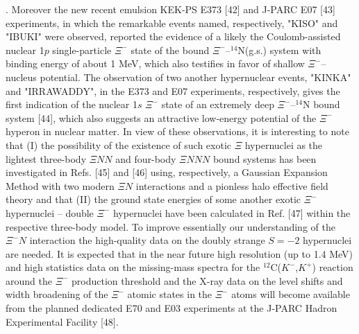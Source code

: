 \documentclass[12pt]{article}
\begin{document}
.
Moreover the new recent emulsion KEK-PS E373 [42] and J-PARC E07 [43] experiments,
in which the remarkable events named, respectively, "KISO" and "IBUKI" were observed, reported the evidence
of a likely the Coulomb-assisted nuclear 1$p$ single-particle $\Xi^-$ state of the bound
$\Xi^-$--$^{14}$N(g.s.) system with binding energy of about 1 MeV, which also testifies in favor of shallow
$\Xi^-$--nucleus potential. The observation of two another hypernuclear events, "KINKA" and "IRRAWADDY",
in the E373 and E07 experiments, respectively, gives the first indication of the nuclear 1$s$ $\Xi^-$ state
of an extremely deep $\Xi^-$--$^{14}$N bound system [44], which also suggests an attractive low-energy potential
of the $\Xi^-$ hyperon in nuclear matter. In view of these observations, it is interesting to note that (I) the
possibility of the existence of such exotic $\Xi$ hypernuclei as the lightest three-body ${\Xi}NN$ and
four-body ${\Xi}NNN$ bound systems has been investigated in Refs. [45] and [46] using, respectively, a
Gaussian Expansion Method with two modern ${\Xi}N$ interactions and a pionless halo effective field theory
and that (II) the ground state energies of some another exotic $\Xi^-$ hypernuclei -- double $\Xi^-$ hypernuclei
have been calculated in Ref. [47] within the respective three-body model.
To improve essentially our understanding of the $\Xi^-N$ interaction the high-quality data on the doubly
strange $S=-2$ hypernuclei are needed. It is expected that in the near future high resolution (up to 1.4 MeV)
and high statistics data on the missing-mass spectra for the $^{12}$C($K^-$,$K^+$) reaction around the $\Xi^-$
production threshold and the X-ray data on the level shifts and width broadening of the $\Xi^-$ atomic states in the
$\Xi^-$ atoms will become available from the planned dedicated E70 and E03 experiments at the J-PARC Hadron
Experimental Facility [48].
\end{document}
